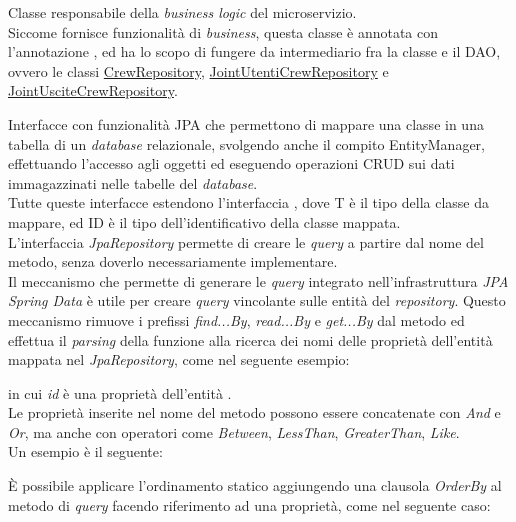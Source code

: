 Classe responsabile della \textit{business logic} del \gls{microservizio}.  \\
Siccome fornisce funzionalità di \textit{business}, questa classe è annotata con l'annotazione , ed ha lo scopo di fungere da intermediario fra la classe  e  il \gls{DAO}, ovvero le classi \hyperref[CrewRepository]{CrewRepository}, \hyperref[JointUtentiCrewRepository]{JointUtentiCrewRepository} e \hyperref[JointUsciteCrewRepository]{JointUsciteCrewRepository}. 

\label{Repository}
Interfacce con funzionalità \gls{JPA} che permettono di mappare una classe in una tabella di un \textit{database} relazionale, svolgendo anche il compito \gls{EntityManager}, effettuando l'accesso agli oggetti ed eseguendo operazioni \gls{CRUD} sui dati immagazzinati nelle tabelle del \textit{database}.\\
Tutte queste interfacce estendono l'interfaccia , dove T è il tipo della classe da mappare, ed ID è il tipo dell'identificativo della classe mappata.\\
L'interfaccia \textit{JpaRepository} permette di creare le \textit{query} a partire dal nome del metodo, senza doverlo necessariamente implementare.\\
Il meccanismo che permette di generare le \textit{query} integrato nell'infrastruttura \textit{JPA Spring Data} è utile per creare \textit{query} vincolante sulle entità del \textit{repository}. Questo meccanismo rimuove i prefissi \textit{find...By}, \textit{read...By} e \textit{get...By} dal metodo ed effettua il \textit{parsing} della funzione alla ricerca dei nomi delle proprietà dell'entità mappata nel \textit{JpaRepository}, come nel seguente esempio: 
\begin{center}
\end{center}
in cui \textit{id} è una proprietà dell'entità .\\ 
 Le proprietà inserite nel nome del metodo possono essere concatenate con \textit{And} e \textit{Or}, ma anche con operatori come \textit{Between}, \textit{LessThan}, \textit{GreaterThan}, \textit{Like}. \\
 Un esempio è il seguente: 
 \begin{center}
 \end{center}
È possibile applicare l'ordinamento statico aggiungendo una clausola \textit{OrderBy} al metodo di \textit{query} facendo riferimento ad una proprietà, come nel seguente caso:  
